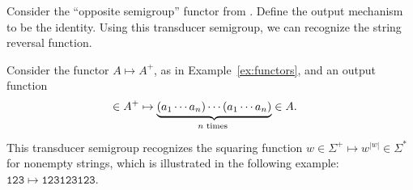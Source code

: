 \begin{example}
 Consider the \enquote{opposite semigroup} functor from . Define the output mechanism to be the identity. Using this transducer semigroup, we can recognize the string reversal function.
\end{example}

\begin{example}\label{ex:squaring}
 Consider the functor $A \mapsto A^+$, as in Example~\ref{ex:functors}, and an output function 
 \begin{align*}
 [a_1,\ldots,a_n] \in A^+ & \mapsto \myunderbrace{(a_1 \cdots a_n) \cdots (a_1 \cdots a_n)}{$n$ times} \in A.
 \end{align*}
 This transducer semigroup recognizes the squaring function $w \in \Sigma^+ \mapsto w^{|w|} \in \Sigma^*$ for nonempty strings, which is illustrated in the following example: $\mathtt{123 \mapsto 123123123}$.
\end{example}
 
 


